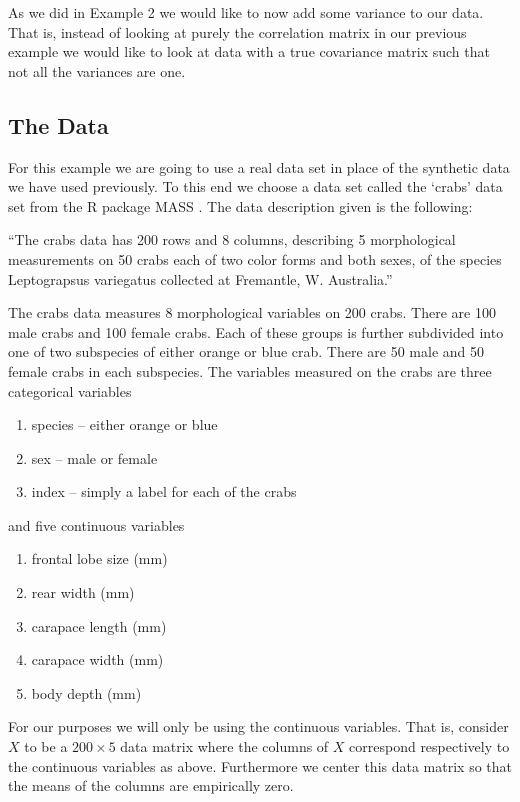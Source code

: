 \documentclass{book}
\begin{document}
As we did in Example 2 we would like to now add some variance to our data. That is, instead of looking at purely the correlation matrix in our previous example we would like to look at data with a true covariance matrix such that not all the variances are one. 

\subsection{The Data}

For this example we are going to use a real data set in place of the synthetic data we have used previously. To this end we choose a data set called the `crabs' data set from the R package MASS \cite{campbell}. The data description given is the following: 

``The crabs data has 200 rows and 8 columns, describing 5 morphological measurements on 50 crabs each of two color forms and both sexes, of the species Leptograpsus variegatus collected at Fremantle, W. Australia.''

The crabs data measures 8 morphological variables on 200 crabs. There are 100 male crabs and 100 female crabs. Each of these groups is further subdivided into one of two subspecies of either orange or blue crab. There are 50 male and 50 female crabs in each subspecies. The variables measured on the crabs are three categorical variables
\begin{enumerate}
\item species -- either orange or blue
\item sex -- male or female
\item index -- simply a label for each of the crabs
\end{enumerate}
and five continuous variables
\begin{enumerate}
\item frontal lobe size (mm)
\item rear width (mm)
\item carapace length (mm)
\item carapace width (mm)
\item body depth (mm)
\end{enumerate}

For our purposes we will only be using the continuous variables. That is, consider $X$ to be a $200 \times 5$ data matrix where the columns of $X$ correspond respectively to the continuous variables as above. Furthermore we center this data matrix so that the means of the columns are empirically zero. 
\end{document}
